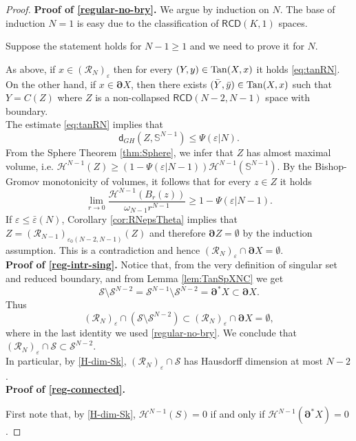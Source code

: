 \documentclass[a4paper]{amsart}
\newcounter{assu}
\theoremstyle{plain}
\theoremstyle{definition}
\numberwithin{equation}{section}
\renewcommand{\S}{\mathcal{S}}
\newcommand{\RCD}{\mathsf{RCD}}
\newcommand{\sfd}{\mathsf d}
\newcommand{\cH}{\mathcal{H}}
\newcommand{\eps}{\varepsilon}
\newcommand{\bRCD}{\boldsymbol\partial}
\begin{document}
{\begin{proof}
\textbf{Proof of \eqref{regular-no-bry}.} 
We argue by induction on $N$. The base of induction $N=1$ is easy due to the classification of $\RCD(K,1)$ spaces.

Suppose the statement holds for $N-1\ge 1$ and we need to prove it for $N$.

As above,  if $x \in  ({\mathcal R}_{N})_{\eps}$ then for every $(Y,y)\in {\rm Tan}(X,x)$ it holds  \eqref{eq:tanRN}.
On the other hand, if $x\in \bRCD X$, then there exists $(\bar{Y},\bar{y})\in {\rm Tan}(X,x)$ such that $Y=C(Z)$ where $Z$ is a non-collapsed $\RCD(N-2,N-1)$ space with boundary.
%
%
\\The estimate \eqref{eq:tanRN} implies that 
\begin{equation}\label{eq:ZRN}
\sfd_{GH}(Z, {\mathbb S}^{N-1})\leq \Psi(\eps|N).
\end{equation}
From the Sphere Theorem \ref{thm:Sphere}, we infer that $Z$ has almost maximal volume, i.e.  $\cH^{N-1}(Z)\geq (1-\Psi(\eps|N-1)) \cH^{N-1}( {\mathbb S}^{N-1})$. By the Bishop-Gromov monotonicity of volumes, it follows that for every $z\in Z$ it holds
$$
\lim_{r\to 0} \frac{\cH^{N-1}(B_{r}(z))}{\omega_{N-1} r^{N-1}}\geq 1-\Psi(\eps|N-1).
$$
{ If  $\eps\le \bar{\eps}(N)$, Corollary \ref{cor:RNepsTheta} implies} that  $Z=({\mathcal R}_{N-1})_{\eps_0(N-2,N-1)}(Z)$ and therefore $\bRCD Z=\emptyset$ by the induction assumption. This is a contradiction and hence $({\mathcal R}_{N})_{\eps}\cap \bRCD X=\emptyset$.
\\




\textbf{Proof of \eqref{reg-intr-sing}.} Notice that, from the very definition of singular set and reduced boundary, and from  Lemma \ref{lem:TanSpXNC} we get
\begin{equation}\label{SdeX}
\S\setminus \S^{N-2}=\S^{N-1}\setminus \S^{N-2}=\bRCD^* X\subset \bRCD X.
\end{equation}
Thus $$ ({\mathcal R}_{N})_{\eps}\cap (\S\setminus \S^{N-2})\subset ({\mathcal R}_{N})_{\eps}\cap  \bRCD X=\emptyset,$$ where in the last identity we used \eqref{regular-no-bry}.
We conclude that $({\mathcal R}_{N})_{\eps}\cap \S\subset \S^{N-2}$. 
\\ {In particular, by \eqref{H-dim-Sk},}   $({\mathcal R}_{N})_{\eps}\cap \S$ has Hausdorff dimension at most $N-2$.
\\

\textbf{Proof of \eqref{reg-connected}.}  

{ First note that, by \eqref{H-dim-Sk},  $\cH^{N-1}(S)=0$ if and only if $\cH^{N-1}(\bRCD^* X)=0$.}


\end{proof}}
\end{document}
